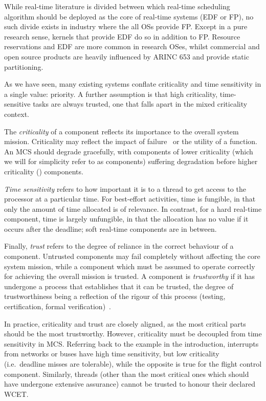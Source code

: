 While real-time literature is divided between which real-time scheduling algorithm should be
deployed as the core of real-time systems (\gls{EDF} or \gls{FP}), no such divide exists in industry
where the all \glspl{OS} provide \gls{FP}. 
Except in a pure research sense, kernels that provide
\gls{EDF} do so in addition to \gls{FP}.  Resource reservations and \gls{EDF} are more common in
research OSes, whilst commercial and open source products are heavily influenced by ARINC 653 and
provide static partitioning. 

As we have seen, many existing systems conflate criticality and time sensitivity 
in a single value: priority. A further assumption is that high criticality, time-sensitive tasks are
always trusted, one that falls apart in the mixed criticality context.

The \emph{criticality} of a component reflects its importance to the
overall system mission.
Criticality may reflect the impact of failure~\citep{ARINC653} or the
utility of a function. An MCS should degrade gracefully, with
components of lower criticality (which we will for simplicity refer to
as  components) suffering degradation before higher
criticality () components.

\emph{Time sensitivity} refers to how important it is to a thread to
get access to the processor at a particular time. For best-effort activities, time is
fungible, in that only the amount of time allocated is of
relevance. In contrast, for a hard real-time component, time is
largely unfungible, in that the allocation has no value if it occurs after
the deadline; soft real-time components are in between.

Finally, \emph{trust} refers to the degree of reliance in the correct
behaviour of a component. Untrusted components may fail completely
without affecting the core system mission, while a component which
must be assumed to operate correctly for achieving the overall mission
is trusted. A component is \emph{trustworthy} if it has undergone a process
that establishes that it can be trusted, the degree of trustworthiness
being a reflection of the rigour of this process (testing,
certification, formal verification)~\citep{Verissimo_NC_03}.

In practice, criticality and trust are closely aligned, as the most
critical parts should be the most trustworthy.
However, criticality must be decoupled from time sensitivity in MCS.
Referring back to the
example in the introduction, interrupts from networks or buses have
high time sensitivity, but low criticality (i.e.\ deadline misses are
tolerable), while the opposite is true for the flight control component.
Similarly, threads (other than the most critical ones which should
have undergone extensive assurance) cannot be
trusted to honour their declared WCET.

